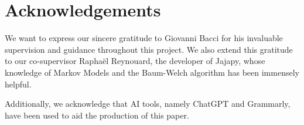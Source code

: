 \section{Acknowledgements}\label{sec:acknowledgements}
We want to express our sincere gratitude to Giovanni Bacci for his invaluable supervision and guidance throughout this project. We also extend this gratitude to our co-supervisor Raphaël Reynouard, the developer of Jajapy, whose knowledge of Markov Models and the Baum-Welch algorithm has been immensely helpful.

Additionally, we acknowledge that AI tools, namely ChatGPT and Grammarly, have been used to aid the production of this paper.